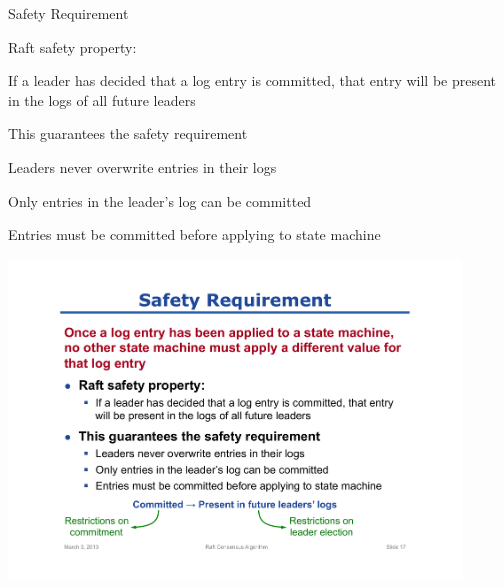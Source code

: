\begin{frame}{Safety Requirement}
	

\BIL
\item Raft safety property:
	\BI
	\item If a leader has decided that a log entry is committed, that entry will be present in the logs of all future leaders
	\item This guarantees the safety requirement
	\EI
\item Leaders never overwrite entries in their logs
	\BI
	\item Only entries in the leader's log can be committed
	\item Entries must be committed before applying to state machine
	\EI
\EIL

\begin{center}
\includegraphics[width=0.9\textwidth]{safety}
\end{center}


\end{frame}


